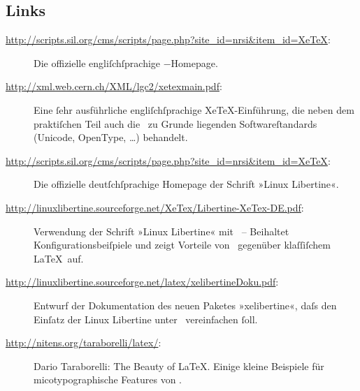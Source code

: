 \documentclass{scrartcl}
\begin{document}
\subsection*{Links}
\begin{description}
\item[\url{http://scripts.sil.org/cms/scripts/page.php?site_id=nrsi&item_id=XeTeX}:] Die offizielle engliſchſprachige \XeTeX−Homepage.
\item[\url{http://xml.web.cern.ch/XML/lgc2/xetexmain.pdf}:] Eine ſehr ausführliche engliſchſprachige XeTeX-Einführung, die neben dem praktiſchen Teil auch die \XeTeX\ zu Grunde liegenden Softwareſtandards (Unicode, OpenType, …) behandelt.
\item[\url{http://scripts.sil.org/cms/scripts/page.php?site_id=nrsi&item_id=XeTeX}:] Die offizielle deutſchſprachige Homepage der Schrift »Linux Libertine«.
\item[\url{http://linuxlibertine.sourceforge.net/XeTex/Libertine-XeTex-DE.pdf}:] Verwendung der Schrift »Linux Libertine« mit \XeTeX\ – Beihaltet Konfigurationsbeiſpiele und zeigt Vorteile von \XeTeX\ gegenüber klaſſiſchem \LaTeX\ auf.
\item[\url{http://linuxlibertine.sourceforge.net/latex/xelibertineDoku.pdf}:] Entwurf der Dokumentation des neuen Paketes »xelibertine«, daſs den Einſatz der Linux Libertine unter \XeTeX\ vereinfachen ſoll.
\item[\url{http://nitens.org/taraborelli/latex/}:] Dario Taraborelli: The Beauty of LaTeX. Einige kleine Beispiele für micotypographische Features von \XeTeX.
\end{description}



\end{document}
